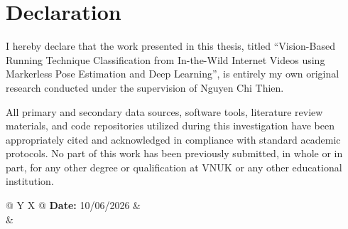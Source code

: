 \chapter*{Declaration}

I hereby declare that the work presented in this thesis, titled ``Vision-Based Running Technique Classification from In-the-Wild Internet Videos using Markerless Pose Estimation and Deep Learning'', is entirely my own original research conducted under the supervision of Nguyen Chi Thien. 

All primary and secondary data sources, software tools, literature review materials, and code repositories utilized during this investigation have been appropriately cited and acknowledged in compliance with standard academic protocols. No part of this work has been previously submitted, in whole or in part, for any other degree or qualification at VNUK or any other educational institution.

\vspace{2.0cm}

\noindent
\begin{tabularx}{\textwidth}{@{} Y X @{}}
    \textbf{Date:} 10/06/2026 &  \\[1.5cm]
    & 
\end{tabularx}